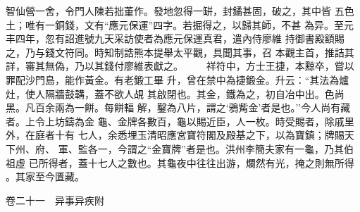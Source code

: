\documentclass{ctexart}
\begin{document}
智仙營一舍，令門人陳若拙董作。發地忽得一缾，封鐍甚固，破之，其中皆 五色土；唯有一銅錢，文有``應元保運''四字。若掘得之，以歸其師，不甚 為异。至元丰四年，忽有詔進號九天采訪使者為應元保運真君，遣內侍廖維 持御書殿額賜之，乃与錢文符同。時知制誥熊本提舉太平觀，具聞其事，召 本觀主首，推詰其詳，審其無偽，乃以其錢付廖維表獻之。 　　祥符中，方士王捷，本黥卒，嘗以罪配沙門島，能作黃金。有老鍛工畢 升，曾在禁中為捷鍛金。升云：``其法為爐灶，使人隔牆鼓韝，蓋不欲人覘 其啟閉也。其金，鐵為之，初自冶中出。色尚黑。凡百余兩為一餅。每餅輻 解，鑿為八片，謂之`鴉觜金'者是也。''今人尚有藏者。上令上坊鑄為金 龜、金牌各數百，龜以賜近臣，人一枚。時受賜者，除戚里外，在庭者十有 七人，余悉埋玉清昭應宮寶符閣及殿基之下，以為寶鎮；牌賜天下州、府、 軍、監各一，今謂之``金寶牌''者是也。洪州李簡夫家有一龜，乃其伯祖虛 已所得者，蓋十七人之數也。其龜夜中往往出游，爛然有光，掩之則無所得 。其家至今匱藏。

卷二十一　异事异疾附
\end{document}
